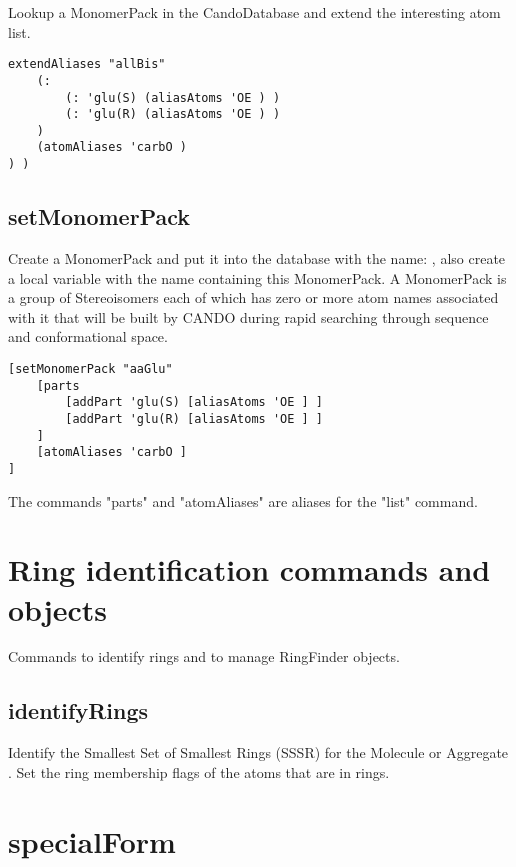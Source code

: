 \begin{itemize}
Lookup a MonomerPack in the CandoDatabase and extend the interesting atom list.



\begin{verbatim}
extendAliases "allBis"
    (:
        (: 'glu(S) (aliasAtoms 'OE ) )
        (: 'glu(R) (aliasAtoms 'OE ) )
    )
    (atomAliases 'carbO )
) )
\end{verbatim}

\subsection{setMonomerPack}
\par
{}\par

Create a MonomerPack and put it into the database with the name: , also create a local variable with the name  containing this MonomerPack. A MonomerPack is a group of Stereoisomers each of which has zero or more atom names associated with it that will be built by CANDO during rapid searching through sequence and conformational space. 

\begin{verbatim}
[setMonomerPack "aaGlu"
    [parts
        [addPart 'glu(S) [aliasAtoms 'OE ] ]
        [addPart 'glu(R) [aliasAtoms 'OE ] ]
    ]
    [atomAliases 'carbO ]
]
\end{verbatim}

The commands "parts" and "atomAliases" are aliases for the "list" command.

\section{Ring identification commands and objects}
Commands to identify rings and to manage RingFinder objects.

\subsection{identifyRings}

Identify the Smallest Set of Smallest Rings (SSSR) for the Molecule or Aggregate .
Set the ring membership flags of the atoms that are in rings.

\section{specialForm}

\end{itemize}
